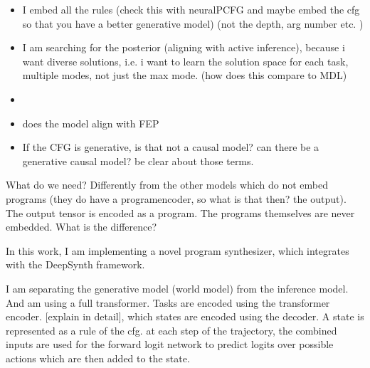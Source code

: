 \begin{itemize}
    \item I embed all the rules (check this with neuralPCFG and maybe embed the cfg so that you have a better generative model) (not the depth, arg number etc. )
    \item I am searching for the posterior (aligning with active inference), because i want diverse solutions, i.e. i want to learn the solution space for each task, multiple modes, not just the max mode. (how does this compare to MDL)
    \item 
\end{itemize}


\begin{itemize}
    \item does the model align with FEP
    \item If the CFG is generative, is that not a causal model? can there be a generative causal model? be clear about those terms. 
\end{itemize}


What do we need? Differently from the other models which do not embed programs (they do have a programencoder, so what is that then? the output). The output tensor is encoded as a program. The programs themselves are never embedded. What is the difference?

In this work, I am implementing a novel program synthesizer, which integrates with the DeepSynth framework. 

I am separating the generative model (world model) from the inference model. And am using a full transformer.
Tasks are encoded using the transformer encoder. [explain in detail], which states are encoded using the decoder. A state is represented as a rule of the cfg.
at each step of the trajectory, the combined inputs are used for the forward logit network to predict logits over possible actions which are then added to the state.
















